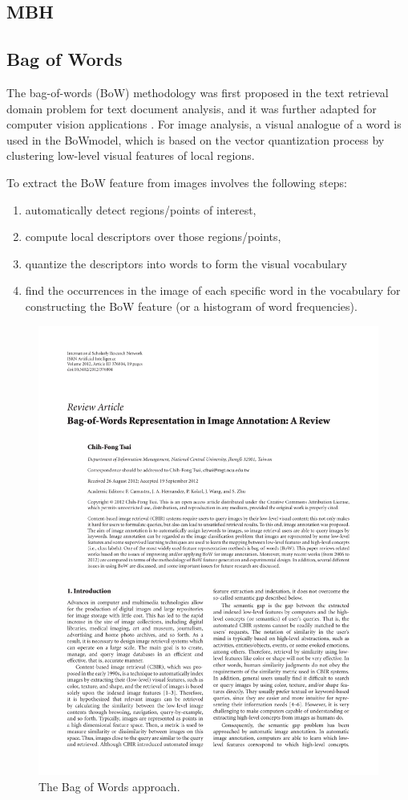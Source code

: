 \subsection{MBH}
\subsection{Bag of Words}
The bag-of-words (BoW) methodology was first proposed in the text retrieval domain problem for text document analysis, and it was further adapted for computer vision applications \cite{bosch2007best}. For image analysis, a visual analogue of a word is used in the BoWmodel, which is based on the vector quantization process by clustering low-level visual features of local regions. 

To extract the BoW feature from images involves the following steps: 
\begin{enumerate}
\item automatically detect regions/points of interest,
\item compute local descriptors over those regions/points,
\item quantize the descriptors into words to form the visual vocabulary
\item find the occurrences in the image of each specific word in the vocabulary for constructing the BoW feature (or a histogram of word frequencies).
\end{enumerate}

\begin{figure}[htbp]
	\centering
		\includegraphics[page=3]{Figures/376804_cropped.pdf}
	\caption{The Bag of Words approach.}
	\label{fig:BoW}
\end{figure}

